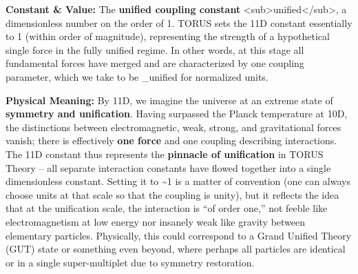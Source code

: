 \documentclass[
]{article}
\begin{document}
\textbf{Constant \& Value:} The \textbf{unified coupling constant}
\alpha\textless sub\textgreater unified\textless/sub\textgreater, a
dimensionless number on the order of 1\hspace{0pt}. TORUS sets the 11D
constant essentially to 1 (within order of magnitude), representing the
strength of a hypothetical single force in the fully unified regime. In
other words, at this stage all fundamental forces have merged and are
characterized by one coupling parameter, which we take to be \alpha\_unified
 for normalized units.

\textbf{Physical Meaning:} By 11D, we imagine the universe at an extreme
state of \textbf{symmetry and unification}. Having surpassed the Planck
temperature at 10D, the distinctions between electromagnetic, weak,
strong, and gravitational forces vanish; there is effectively
\textbf{one force} and one coupling describing interactions\hspace{0pt}.
The 11D constant thus represents the \textbf{pinnacle of unification} in
TORUS Theory -- all separate interaction constants have flowed together
into a single dimensionless constant. Setting it to \textasciitilde1 is
a matter of convention (one can always choose units at that scale so
that the coupling is unity), but it reflects the idea that at the
unification scale, the interaction is ``of order one,'' not feeble like
electromagnetism at low energy nor insanely weak like gravity between
elementary particles. Physically, this could correspond to a Grand
Unified Theory (GUT) state or something even beyond, where perhaps all
particles are identical or in a single super-multiplet due to symmetry
restoration\hspace{0pt}.
\end{document}
